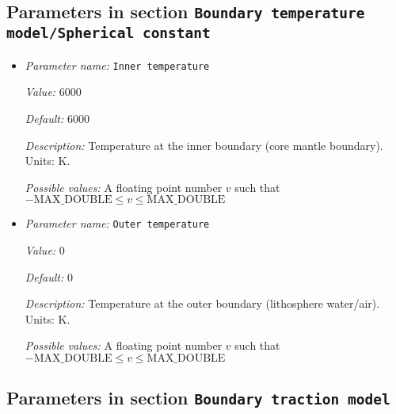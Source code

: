 \subsection{Parameters in section \tt Boundary temperature model/Spherical constant}
\label{parameters:Boundary_20temperature_20model/Spherical_20constant}

\begin{itemize}
\item {\it Parameter name:} {\tt Inner temperature}
\label{parameters:Boundary temperature model/Spherical constant/Inner temperature}


{\it Value:} 6000


{\it Default:} 6000


{\it Description:} Temperature at the inner boundary (core mantle boundary). Units: K.


{\it Possible values:} A floating point number $v$ such that $-\text{MAX\_DOUBLE} \leq v \leq \text{MAX\_DOUBLE}$
\item {\it Parameter name:} {\tt Outer temperature}
\label{parameters:Boundary temperature model/Spherical constant/Outer temperature}


{\it Value:} 0


{\it Default:} 0


{\it Description:} Temperature at the outer boundary (lithosphere water/air). Units: K.


{\it Possible values:} A floating point number $v$ such that $-\text{MAX\_DOUBLE} \leq v \leq \text{MAX\_DOUBLE}$
\end{itemize}

\subsection{Parameters in section \tt Boundary traction model}
\label{parameters:Boundary_20traction_20model}

